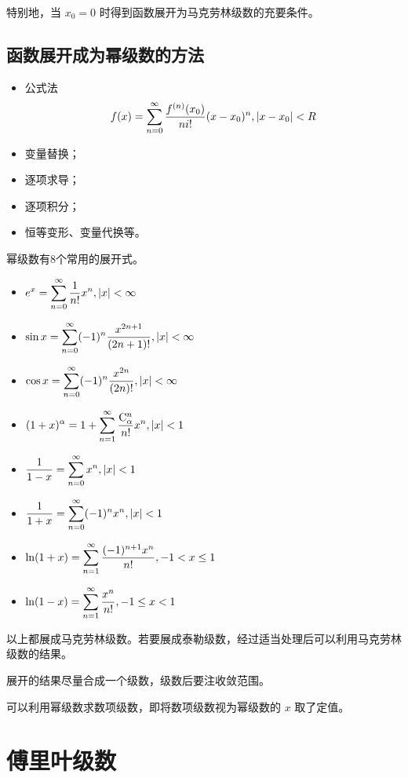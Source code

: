 特别地，当 $ x_0 = 0 $ 时得到函数展开为马克劳林级数的充要条件。

\subsection{函数展开成为幂级数的方法}

\begin{itemize}
    \item 公式法 $$
     \displaystyle f(x) = \sum_{n=0}^\infty \dfrac{f^{(n)}(x_0)}{ni!}(x-x_0)^n,|x-x_0|<R 
    $$
    \item 变量替换；
    \item 逐项求导；
    \item 逐项积分；
    \item 恒等变形、变量代换等。
\end{itemize}

幂级数有8个常用的展开式。

\begin{itemize}
    \item $ \displaystyle e^x = \sum_{n=0}^{\infty}\dfrac{1}{n!}x^n, |x|<\infty $ 
    \item $ \displaystyle \sin x = \sum_{n=0}^{\infty}(-1)^n\dfrac{x^{2n+1}}{(2n+1)!},|x|<\infty $ 
    \item $ \displaystyle \cos x = \sum_{n=0}^{\infty}(-1)^n\dfrac{x^{2n}}{(2n)!},|x|<\infty $ 
    \item $ \displaystyle (1+x)^\alpha = 1 + \sum_{n=1}^{\infty}\dfrac{\mathrm{C}_\alpha^n}{n!}x^n, |x|<1 $ 
    \item $ \displaystyle \dfrac{1}{1-x} = \sum_{n=0}^{\infty}x^n, |x|<1 $ 
    \item $ \displaystyle \dfrac{1}{1+x} = \sum_{n=0}^{\infty}(-1)^nx^n, |x|<1 $ 
    \item $ \displaystyle \ln(1+x) = \sum_{n=1}^{\infty} \dfrac{(-1)^{n+1}x^n}{n!}, -1<x\leq 1 $ 
    \item $ \displaystyle \ln(1-x) = \sum_{n=1}^{\infty} \dfrac{x^n}{n!}, -1\leq x< 1 $ 
\end{itemize}

以上都展成马克劳林级数。若要展成泰勒级数，经过适当处理后可以利用马克劳林级数的结果。

展开的结果尽量合成一个级数，级数后要注收敛范围。

可以利用幂级数求数项级数，即将数项级数视为幂级数的 $ x $ 取了定值。

\section{傅里叶级数}

